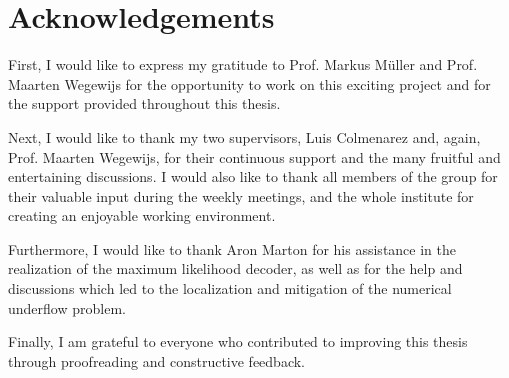 \chapter*{Acknowledgements}

First, I would like to express my gratitude to Prof. Markus Müller and Prof. Maarten Wegewijs for the opportunity to work on this exciting project and for the support provided throughout this thesis.

Next, I would like to thank my two supervisors, Luis Colmenarez and, again, Prof. Maarten Wegewijs, for their continuous support and the many fruitful and entertaining discussions. 
I would also like to thank all members of the group for their valuable input during the weekly meetings, and the whole institute for creating an enjoyable working environment.

Furthermore, I would like to thank Aron Marton for his assistance in the realization of the maximum likelihood decoder, as well as for the help and discussions which led to the localization and mitigation of the numerical underflow problem.

Finally, I am grateful to everyone who contributed to improving this thesis through proofreading and constructive feedback.